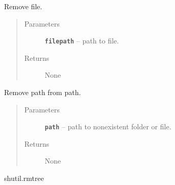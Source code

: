 \documentclass[letterpaper,10pt,english]{sphinxmanual}
\begin{document}

\begin{fulllineitems}
\label{RRtoolbox.lib:RRtoolbox.lib.directory.rmFile}
Remove file.
\begin{quote}\begin{description}
\item[{Parameters}] \leavevmode
\textbf{\texttt{filepath}} -- path to file.

\item[{Returns}] \leavevmode
None

\end{description}\end{quote}

\end{fulllineitems}


\begin{fulllineitems}
\label{RRtoolbox.lib:RRtoolbox.lib.directory.rmPath}
Remove path from path.
\begin{quote}\begin{description}
\item[{Parameters}] \leavevmode
\textbf{\texttt{path}} -- path to nonexistent folder or file.

\item[{Returns}] \leavevmode
None

\end{description}\end{quote}




shutil.rmtree



\end{fulllineitems}

\end{document}
